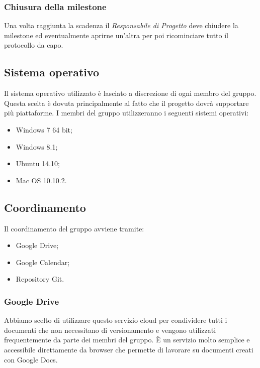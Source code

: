\subsubsection{Chiusura della milestone}

Una volta raggiunta la scadenza il \textit{Responsabile di Progetto} deve chiudere la \gls{milestone} ed eventualmente aprirne un'altra per poi ricominciare tutto il protocollo da capo.




\subsection{Sistema operativo}

Il sistema operativo utilizzato è lasciato a discrezione di ogni membro del gruppo. Questa scelta è dovuta principalmente al fatto che il progetto dovrà supportare più piattaforme.
I membri del gruppo utilizzeranno i seguenti sistemi operativi:

\begin{itemize}
	\item \gls{Windows} 7 64 bit;
	\item \gls{Windows} 8.1;
	\item \gls{Ubuntu} 14.10;
	\item Mac OS 10.10.2.
\end{itemize}

\subsection{Coordinamento}

Il coordinamento del gruppo avviene tramite:
\begin{itemize}
	\item \gls{Google Drive};
	\item \gls{Google Calendar};	
	\item \gls{Repository} \gls{Git}.
\end{itemize}

\subsubsection{Google Drive}

Abbiamo scelto di utilizzare questo \gls{servizio cloud} per condividere tutti i documenti che non necessitano di \gls{versionamento} e vengono utilizzati frequentemente da parte dei membri del gruppo. 
È un servizio molto semplice e accessibile direttamente da \gls{browser} che permette di lavorare su documenti creati con \gls{Google Docs}.

